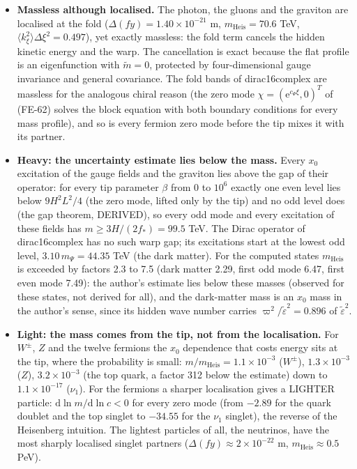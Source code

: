 \documentclass[
  10pt,
]{article}
\providecommand{\tightlist}{%
  \setlength{\itemsep}{0pt}\setlength{\parskip}{0pt}}
\begin{document}
\begin{itemize}
\tightlist
\item
  \textbf{Massless although localised.} The photon, the gluons and the
  graviton are localised at the fold
  (\(\Delta(fy) = 1.40\times10^{-21}\) m, \(m_{\mathrm{Heis}} = 70.6\)
  TeV, \(\langle k_\xi^2\rangle\Delta\xi^2 = 0.497\)), yet exactly
  massless: the fold term cancels the hidden kinetic energy and the
  warp. The cancellation is exact because the flat profile is an
  eigenfunction with \(\tilde m = 0\), protected by four-dimensional
  gauge invariance and general covariance. The fold bands of
  dirac16complex are massless for the analogous chiral reason (the zero
  mode \(\chi = (\mathrm{e}^{c_\Psi\xi}, 0)^T\) of (FE-62) solves the
  block equation with both boundary conditions for every mass profile),
  and so is every fermion zero mode before the tip mixes it with its
  partner.
\item
  \textbf{Heavy: the uncertainty estimate lies below the mass.} Every
  \(x_0\) excitation of the gauge fields and the graviton lies above the
  gap of their operator: for every tip parameter \(\beta\) from \(0\) to
  \(10^6\) exactly one even level lies below \(9H^2L^2/4\) (the zero
  mode, lifted only by the tip) and no odd level does (the gap theorem,
  DERIVED), so every odd mode and every excitation of these fields has
  \(m \ge 3H/(2f_*) = 99.5\) TeV. The Dirac operator of dirac16complex
  has no such warp gap; its excitations start at the lowest odd level,
  \(3.10\,m_\Psi = 44.35\) TeV (the dark matter). For the computed
  states \(m_{\mathrm{Heis}}\) is exceeded by factors 2.3 to 7.5 (dark
  matter 2.29, first odd mode 6.47, first even mode 7.49): the author's
  estimate lies below these masses (observed for these states, not
  derived for all), and the dark-matter mass is an \(x_0\) mass in the
  author's sense, since its hidden wave number carries
  \(\varpi^2/\tilde\varepsilon^2 = 0.896\) of \(\tilde\varepsilon^2\).
\item
  \textbf{Light: the mass comes from the tip, not from the
  localisation.} For \(W^\pm\), \(Z\) and the twelve fermions the
  \(x_0\) dependence that costs energy sits at the tip, where the
  probability is small: \(m/m_{\mathrm{Heis}} = 1.1\times10^{-3}\)
  (\(W^\pm\)), \(1.3\times10^{-3}\) (\(Z\)), \(3.2\times10^{-3}\) (the
  top quark, a factor 312 below the estimate) down to
  \(1.1\times10^{-17}\) (\(\nu_1\)). For the fermions a sharper
  localisation gives a LIGHTER particle:
  \(\mathrm{d}\ln m/\mathrm{d}\ln c < 0\) for every zero mode (from
  \(-2.89\) for the quark doublet and the top singlet to \(-34.55\) for
  the \(\nu_1\) singlet), the reverse of the Heisenberg intuition. The
  lightest particles of all, the neutrinos, have the most sharply
  localised singlet partners (\(\Delta(fy) \approx 2\times10^{-22}\) m,
  \(m_{\mathrm{Heis}} \approx 0.5\) PeV).
\end{itemize}
\end{document}

